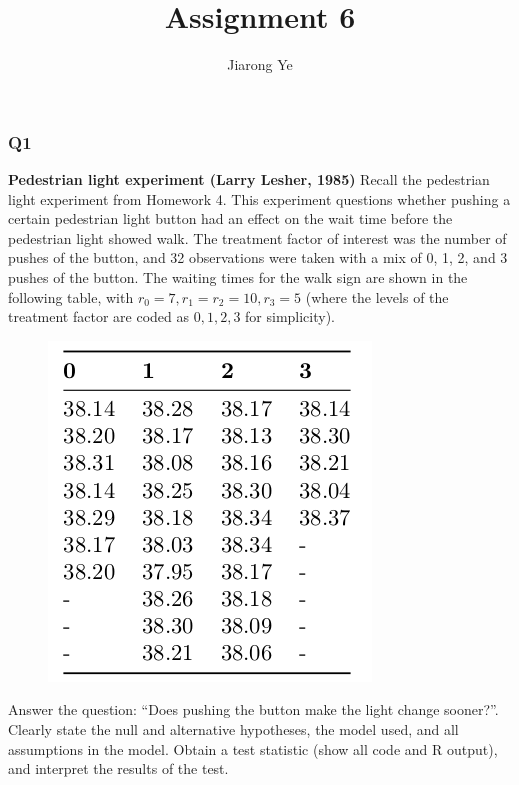 \documentclass[11pt]{article}
\title{Assignment 6}
\author{Jiarong Ye}
\makeatletter
\def\maxwidth{\ifdim\Gin@nat@width>\linewidth\linewidth
    \else\Gin@nat@width\fi}
\let\Oldincludegraphics\includegraphics
\renewcommand{\includegraphics}[1]{\Oldincludegraphics[width=.8\maxwidth]{#1}}
\makeatother
\begin{document}
    
    
    \maketitle
    
    

    
    \subsubsection*{Q1}\label{q1}

    \textbf{Pedestrian light experiment (Larry Lesher, 1985)} Recall the
pedestrian light experiment from Homework 4. This experiment questions
whether pushing a certain pedestrian light button had an effect on the
wait time before the pedestrian light showed walk. The treatment factor
of interest was the number of pushes of the button, and 32 observations
were taken with a mix of 0, 1, 2, and 3 pushes of the button. The
waiting times for the walk sign are shown in the following table, with
\(r_0 = 7, r_1 = r_2 = 10, r_3 = 5\) (where the levels of the treatment
factor are coded as \(0, 1, 2, 3\) for simplicity).

\begin{figure}[H]
\centering
\includegraphics{1.png}
\caption{}
\end{figure}

Answer the question: ``Does pushing the button make the light change
sooner?''. Clearly state the null and alternative hypotheses, the model
used, and all assumptions in the model. Obtain a test statistic (show
all code and R output), and interpret the results of the test.
\end{document}

